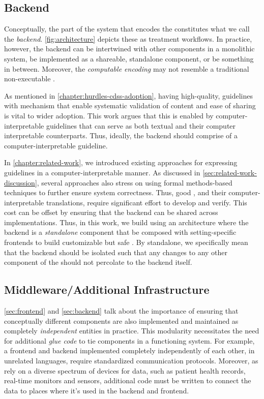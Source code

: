 \subsection{Backend}\label{sec:backend}

Conceptually, the part of the system that encodes the \BPG{}
constitutes what we call the \emph{backend}. \autoref{fig:architecture}
depicts these as treatment workflows.
In practice, however, the backend can be intertwined with other components in a
monolithic system, be implemented as a shareable,
standalone component, or be something in between. Moreover,
the \emph{computable encoding} may not resemble a traditional
non-executable \BPG{}.

As mentioned in \autoref{chapter:hurdles-cdss-adoption}, having
high-quality, guidelines with mechanism that enable systematic
validation of content and ease of sharing is vital to wider
adoption. This work argues that this is enabled by computer-interpretable guidelines that can serve as
both textual \BPGs{} and their computer interpretable counterparts. Thus,
ideally, the backend should comprise of a computer-interpretable guideline.

In \autoref{chapter:related-work}, we introduced existing approaches
for expressing guidelines in a computer-interpretable manner.
As discussed in \autoref{sec:related-work-discussion}, several
approaches also stress on using formal methods-based techniques to further
ensure system correctness. Thus, good \BPGs{}, and
their computer-interpretable translations, require significant
effort to develop and verify. This cost can be
 offset by ensuring that the backend can be shared
across \CDSSs{} implementations. Thus, in this work, we
build \CDSSs{} using an architecture where the backend
is a \emph{standalone} component that be composed with
setting-specific frontends to build customizable but safe \CDSSs{}.
By standalone, we specifically mean that the backend should be isolated
such that any changes to any other  component of the \CDSSs{}
should not percolate to the backend itself.


\subsection{Middleware/Additional Infrastructure}\label{sec:middleware}

\autoref{sec:frontend} and \autoref{sec:backend} talk about
the importance of ensuring that conceptually different components are
also implemented and maintained as completely \emph{independent} entities
in practice. This modularity necessitates the need for additional
\emph{glue code} to tie components in a functioning system. For example,
a frontend and backend implemented completely independently of each
other, in unrelated languages, require standardized communication
protocols. Moreover, as \CDSSs{} rely on a diverse spectrum of devices for
data, such as patient health records, real-time monitors and sensors, additional
code must be written to connect the data to places where it's used in
the backend and frontend.


